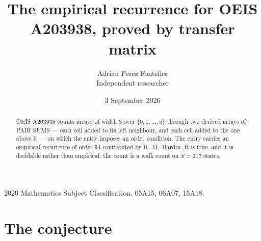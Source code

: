 \documentclass[11pt,a4paper]{article}
\title{The empirical recurrence for OEIS A203938, proved by transfer matrix}
\author{Adrian Perez Fontelles\\ \small Independent researcher}
\date{3 September 2026}
\theoremstyle{plain}
\theoremstyle{definition}
\begin{document}
\maketitle

\begin{abstract}
OEIS A203938 counts arrays of width $3$ over $\{0,1,\dots,5\}$ through two derived arrays of PAIR SUMS ---
each cell added to its left neighbour, and each cell added to the one above it --- on which the
entry imposes an order condition. The entry carries an empirical recurrence of order $94$
contributed by R.~H.~Hardin. It is true, and it is decidable rather than empirical: the count is
a walk count on $S=217$ states.
\end{abstract}

\noindent\small 2020 Mathematics Subject Classification. 05A15, 06A07, 15A18.\normalsize

\section{The conjecture}
\end{document}
